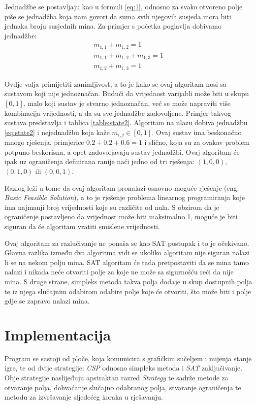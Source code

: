 \documentclass{article}
\numberwithin{figure}{section}
\numberwithin{table}{section}
\begin{document}
Jednadžbe se postavljaju kao u formuli \ref{eq:1}, odnosno za svako otvoreno polje piše se jednadžba koja nam govori da suma svih njegovih susjeda mora biti jednaka broju susjednih mina. Za primjer s početka poglavlja dobivamo jednadžbe:
\begin{gather*}
\label{csp}
    m_{1, 1} + m_{1, 2} = 1 \\
    m_{1, 1} + m_{1, 2}+ m_{1, 3} = 1 \\
    m_{1, 2} + m_{1, 3} = 1
\end{gather*}

Ovdje valja primijetiti zanimljivost, a to je kako se ovaj algoritam nosi sa sustavom koji nije
jednoznačan. Budući da vrijednost varijabli može biti u skupu $[0, 1]$, malo koji sustav je stvarno
jednoznačan, već se može napraviti više kombinacija vrijednosti, a da su sve jednadžbe zadovoljene.
Primjer takvog sustava predstavlja i tablica \ref{table:state2}. Algoritam na ulazu
dobiva jednadžbu \ref{eq:state2} i nejednadžbu koja kaže $m_{i, j} \in [0, 1]$. Ovaj sustav
ima beskonačno mnogo rješenja, primjerice $0.2 + 0.2 + 0.6 = 1$ i slično, koja su za ovakav
problem potpuno beskorisna, a opet zadovoljavaju sustav jednadžbi. Ovaj algoritam će ipak uz ograničenja
definirana ranije naći jedno od tri rješenja: $(1, 0, 0)$, $(0, 1, 0)$ ili $(0, 0, 1)$.

Razlog leži u tome da ovaj algoritam pronalazi osnovno moguće rješenje (eng. \textit{Basic Feasible Solution}), a to je rješenje problema linearnog programiranja koje ima najmanji broj vrijednosti
koje su različite od nula. S obzirom da je ograničenje postavljeno da vrijednost može biti maksimalno 1, moguće je biti siguran da će algoritam vratiti smislene vrijednosti.

Ovaj algoritam za razlučivanje ne ponaša se kao SAT postupak i to je očekivano. Glavna razlika
između dva algoritma vidi se ukoliko algoritam nije siguran nalazi li se na nekom polju
mina. SAT algoritam će tada pretpostaviti da se mina tamo nalazi i nikada neće otvoriti polje za koje ne može sa sigurnošću reći da nije mina. S druge strane, simpleks metoda takva polja dodaje u skup dostupnih polja te iz njega slučajnim odabirom odabire polje koje će otvoriti, što može biti i polje gdje se zapravo nalazi mina.

\section{Implementacija}

Program se sastoji od ploče, koja komunicira s grafičkim sučeljem i mijenja stanje igre, te od dvije strategije: \textit{CSP} odnosno simpleks metoda i \textit{SAT} zaključivanje.
Obje strategije naslijeđuju apstraktan razred \textit{Strategy} te sadrže metode za otvaranje polja, dohvaćanje slučajno odabranog polja, stvaranje ograničenja te metodu za izvršavanje sljedećeg koraka u rješavanju.
\end{document}
